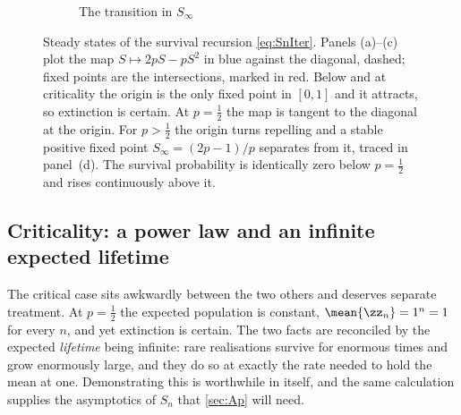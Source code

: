 \begin{figure}[htbp]
    \vspace{10pt}
    \begin{subfigure}[b]{0.55\textwidth}
    \centering
    \caption{The transition in $S_\infty$}
    \end{subfigure}

    \caption{Steady states of the survival recursion \cref{eq:SnIter}. Panels (a)--(c)
    plot the map $S\mapsto2pS-pS^2$ in blue against the diagonal, dashed; fixed points
    are the intersections, marked in red. Below and at criticality the origin is the only
    fixed point in $[0,1]$ and it attracts, so extinction is certain. At $p=\tfrac12$ the
    map is tangent to the diagonal at the origin. For $p>\tfrac12$ the origin turns
    repelling and a stable positive fixed point $S_\infty=(2p-1)/p$ separates from it,
    traced in panel~(d). The survival probability is identically zero below $p=\tfrac12$
    and rises continuously above it.}
    \label{fig:phase_transition}
\end{figure}

\subsection{Criticality: a power law and an infinite expected lifetime}
\label{sec:criticalcase}

The critical case sits awkwardly between the two others and deserves separate treatment.
At $p=\tfrac12$ the expected population is constant, $\mean{\zz_n}=1^n=1$ for every $n$,
and yet extinction is certain. The two facts are reconciled by the expected
\emph{lifetime} being infinite: rare realisations survive for enormous times and grow
enormously large, and they do so at exactly the rate needed to hold the mean at one.
Demonstrating this is worthwhile in itself, and the same calculation supplies the
asymptotics of $S_n$ that \cref{sec:Ap} will need.

